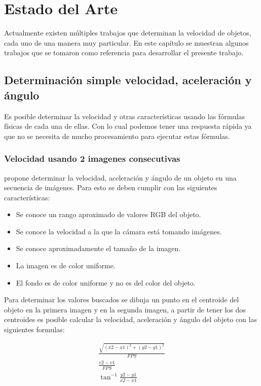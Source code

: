 \chapter{Estado del Arte}

Actualmente existen múltiples trabajos que determinan la velocidad de objetos, cada uno de una manera muy particular. En este capítulo se muestran algunos trabajos que se tomaron como referencia para desarrollar el presente trabajo.

\section{Determinación simple velocidad, aceleración y ángulo}

Es posible determinar la velocidad y otras características usando las fórmulas físicas de cada una de ellas. Con lo cual podemos tener una respuesta rápida ya que no se necesita de mucho procesamiento para ejecutar estas fórmulas.

\subsection{Velocidad usando 2 imagenes consecutivas}

\citeauthor{singh2007Estimating} propone determinar la velocidad, aceleración y ángulo de un objeto en  una secuencia de imágenes. Para esto se deben cumplir con las siguientes características:

\begin{itemize}
\item Se conoce un rango aproximado de valores RGB del objeto.
\item Se conoce la velocidad a la que la cámara está tomando imágenes.
\item Se conoce aproximadamente el tamaño de la imagen.
\item La imagen es de color uniforme.
\item El fondo es de color uniforme y no es del color del objeto.
\end{itemize}

Para determinar los valores buscados se dibuja un punto en el centroide del objeto en la primera imagen y en la segunda imagen, a partir de tener los dos centroides es posible calcular la velocidad, aceleración y ángulo del objeto con las siguientes formulas:

\begin{eqnarray}
    \frac{
        \sqrt{
            (x2-x1)^{2} + (y2-y1)^{2}
        }
    }{
        FPS
    }\\
    \frac{
        v2-v1
    }{
        FPS
    }\\
    \tan^{-1}\frac{y2-y1}{x2-x1}
\end{eqnarray}

